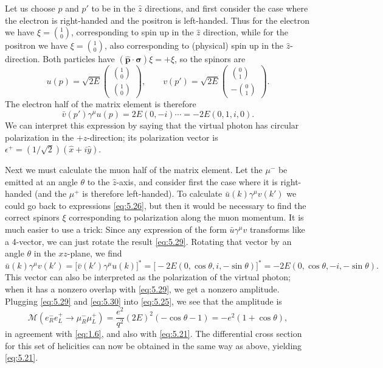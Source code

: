 Let us choose $p$ and $p'$ to be in the $\hat{z}$ directions, and first
consider the case where the electron is right-handed and the positron is
left-handed.  Thus for the electron we have $\xi = \binom{1}{0}$,
corresponding to spin up in the $\hat{z}$ direction, while for the positron we
have $\xi = \binom{1}{0}$, also corresponding to (physical) spin up in the
$\hat{z}$-direction.  Both particles have $(\hat{\mathbf{p}}\cdot\bm{\sigma})
\xi = +\xi$, so the spinors are
\begin{equation}
  u(p) = \sqrt{2E}\begin{pmatrix}\binom{1}{0}\\ \binom{1}{0}\end{pmatrix},
  \qquad v(p') = \sqrt{2E}\begin{pmatrix}\binom{0}{1}\\ -\binom{0}{1}\end{pmatrix}.
  \label{eq:5.28}
\end{equation}
The electron half of the matrix element is therefore
\begin{equation}
  \bar{v}(p')\gamma^\mu u(p) = 2E(0, -i)\cdots = -2E(0, 1, i, 0) .
  \label{eq:5.29}
\end{equation}
We can interpret this expression by saying that the virtual photon has
circular polarization in the $+z$-direction; its polarization vector is
$\epsilon^{+} = (1/\sqrt{2})(\hat{x}+i\hat{y})$.

Next we must calculate the muon half of the matrix element.  Let the
$\mu^{-}$ be emitted at an angle $\theta$ to the $\hat{z}$-axis, and consider
first the case where it is right-handed (and the $\mu^{+}$ is therefore
left-handed).  To calculate $\bar{u}(k)\gamma^\mu v(k')$ we could go back to
expressions \eqref{eq:5.26}, but then it would be necessary to find the
correct spinors $\xi$ corresponding to polarization along the muon momentum.
It is much easier to use a trick: Since any expression of the form
$\bar{u}\gamma^\mu v$ transforms like a 4-vector, we can just rotate the result
\eqref{eq:5.29}.  Rotating that vector by an angle $\theta$ in the $xz$-plane,
we find
\begin{equation}
  \bar{u}(k)\gamma^\mu v(k') = \bigl[ \bar{v}(k')\gamma^\mu u(k) \bigr]^{*}
    = \bigl[ -2E(0, \cos\theta, i, -\sin\theta) \bigr]^{*}
    = -2E(0, \cos\theta, -i, -\sin\theta) .
  \label{eq:5.30}
\end{equation}
This vector can also be interpreted as the polarization of the virtual photon;
when it has a nonzero overlap with \eqref{eq:5.29}, we get a nonzero
amplitude.  Plugging \eqref{eq:5.29} and \eqref{eq:5.30} into
\eqref{eq:5.25}, we see that the amplitude is
\begin{equation}
  \mathcal{M}(e^{-}_R e^{+}_L \to \mu^{-}_R\mu^{+}_L)
    = \frac{e^2}{q^2}(2E)^2(-\cos\theta - 1) = -e^2(1+\cos\theta),
  \label{eq:5.31}
\end{equation}
in agreement with \eqref{eq:1.6}, and also with \eqref{eq:5.21}.  The
differential cross section for this set of helicities can now be obtained in
the same way as above, yielding \eqref{eq:5.21}.

